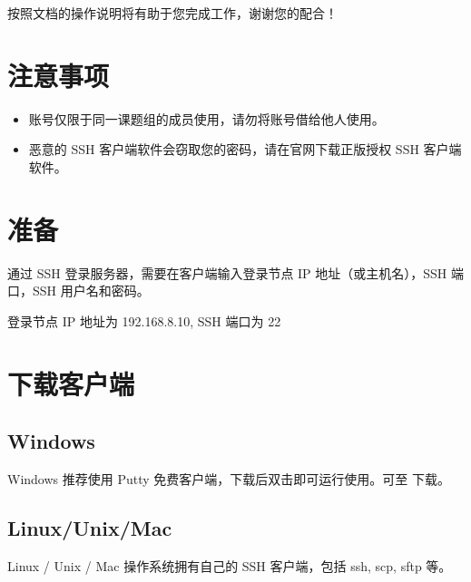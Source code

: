 \documentclass[a4paper,12pt,english]{sphinxmanual}
\begin{document}
\sphinxAtStartPar
按照文档的操作说明将有助于您完成工作，谢谢您的配合！


\section{注意事项}
\label{\detokenize{login/index:id2}}\begin{itemize}
\item {} 
\sphinxAtStartPar
账号仅限于同一课题组的成员使用，请勿将账号借给他人使用。

\item {} 
\sphinxAtStartPar
恶意的 SSH 客户端软件会窃取您的密码，请在官网下载正版授权 SSH 客户端软件。

\end{itemize}


\section{准备}
\label{\detokenize{login/index:id3}}
\sphinxAtStartPar
通过 SSH 登录服务器，需要在客户端输入登录节点 IP 地址（或主机名），SSH 端口，SSH 用户名和密码。

\begin{sphinxVerbatim}[commandchars=\\\{\}]
     
 
 
\end{sphinxVerbatim}

\sphinxAtStartPar
登录节点 IP 地址为 192.168.8.10, SSH 端口为 22


\section{下载客户端}
\label{\detokenize{login/index:id4}}

\subsection{Windows}
\label{\detokenize{login/index:windows}}
\sphinxAtStartPar
Windows 推荐使用 Putty 免费客户端，下载后双击即可运行使用。可至 下载。


\subsection{Linux/Unix/Mac}
\label{\detokenize{login/index:linux-unix-mac}}
\sphinxAtStartPar
Linux / Unix / Mac 操作系统拥有自己的 SSH 客户端，包括 ssh, scp, sftp 等。
\end{document}
